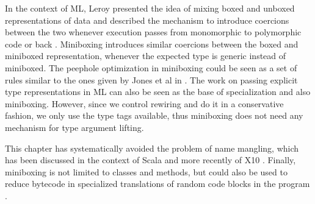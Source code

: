 In the context of ML, {Leroy} presented the idea of mixing boxed and unboxed representations of data and described the mechanism to introduce coercions between the two whenever execution passes from monomorphic to polymorphic code or back \cite{leroy-unboxed-objects}. Miniboxing introduces similar coercions between the boxed and miniboxed representation, whenever the expected type is generic instead of miniboxed. The peephole optimization in miniboxing could be seen as a set of rules similar to the ones given by {Jones et al} in \cite{spj-unboxed-values}. The work on passing explicit type representations in ML \cite{harper-intensional-type-analysis, tolmach-tag-free-gc, tarditi-til, minamide-full-lifting} can also be seen as the base of specialization and also miniboxing. However, since we control rewiring and do it in a conservative fashion, we only use the type tags available, thus miniboxing does not need any mechanism for type argument lifting.

This chapter has systematically avoided the problem of name mangling, which has been discussed in the context of Scala \cite{iuli-thesis} and more recently of X10 \cite{x10-fast-dispatch}. Finally, miniboxing is not limited to classes and methods, but could also be used to reduce bytecode in specialized translations of random code blocks in the program \cite{bridging}.


